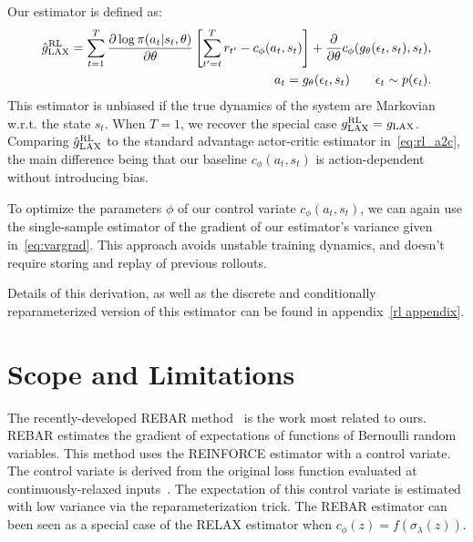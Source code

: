 \documentclass{article}
\newcommand{\LL}[1]{\frac{\partial \log \pi(a_{#1}| s_{#1}, \theta)}{\partial \theta}}
\newcommand{\YW}[1]{{\color{red} \bf [[YW: #1]]}}
\newcommand{\LAX}{{\textnormal{LAX}}}
\newcommand{\RL}{{\textnormal{RL}}}
\begin{document}
Our estimator is defined as: 
%
\begin{align}
\hat g_\LAX^{\RL} = \sum_{t=1}^T \LL{t} \left[ \sum_{t'=t}^T r_{t'} - c_\phi(a_t,s_t) \right] +\frac{\partial}{\partial\theta} c_\phi(g_\theta(\epsilon_t,s_t), s_t), \\
a_t = g_\theta(\epsilon_t,s_t) \qquad \epsilon_t \sim p(\epsilon_t)\nonumber.
\label{eq:rl_est}
\end{align}
%
This estimator is unbiased if the true dynamics of the system are Markovian w.r.t. the state $s_t$.
When $T = 1$, we recover the special case ${g_\LAX^{\RL} = g_\LAX}$.
Comparing $\hat g_\LAX^{\RL}$ to the standard advantage actor-critic estimator in~\eqref{eq:rl_a2c}, the main difference being that our baseline $c_\phi(a_t, s_t)$ is action-dependent without introducing bias.

To optimize the parameters $\phi$ of our control variate $c_\phi(a_t, s_t)$, we can again use the single-sample estimator of the gradient of our estimator's variance given in~\eqref{eq:vargrad}.
This approach avoids unstable training dynamics, and doesn't require storing and replay of previous rollouts.

Details of this derivation, as well as the discrete and conditionally reparameterized version of this estimator can be found in appendix~\ref{rl appendix}.

\section{Scope and Limitations}
\label{limitations}
The recently-developed REBAR method~\citep{tucker2017rebar} is the work most related to ours.
REBAR estimates the gradient of expectations of functions of Bernoulli random variables.
This method uses the REINFORCE estimator with a control variate.
The control variate is derived from the original loss function evaluated at continuously-relaxed inputs~\citep{maddison2016concrete, jang2016categorical}.
The expectation of this control variate is estimated with low variance via the reparameterization trick.
The REBAR estimator can been seen as a special case of the RELAX estimator when ${c_\phi(z) = f(\sigma_\lambda(z))}$.
\end{document}
